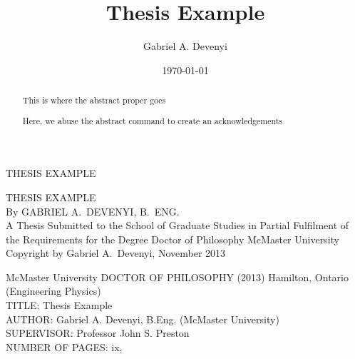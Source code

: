 \documentclass[letterpaper,12pt,twoside,openright]{report}
\title{Thesis Example}
\author{Gabriel A. Devenyi}
\date{\today}
\begin{document}
\begin{titlepage} %
    \thispagestyle{empty}
    \vspace*{\fill}
    \begin{center}{\Large
    \uppercase{Thesis Example}}
    \end{center}
    \vspace*{\fill}
    \setcounter{page}{0} %
\end{titlepage}

\begin{titlepage} %
\thispagestyle{empty}
\centering
\vspace*{\fill} %
{\Large \uppercase{Thesis Example}\\
\vfill
By GABRIEL A.\ DEVENYI, B.\ ENG.\\}
\vfill
A Thesis Submitted to the School of Graduate Studies in Partial Fulfilment of
the Requirements for the Degree Doctor of Philosophy
\vfill%
McMaster University \textcopyright{} Copyright by Gabriel A.\ Devenyi, November 2013
\end{titlepage}
{\noindent McMaster University DOCTOR OF PHILOSOPHY (2013) Hamilton, Ontario (Engineering Physics)\\
TITLE: Thesis Example\\
AUTHOR: Gabriel A. Devenyi, B.Eng. (McMaster University)\\
SUPERVISOR: Professor John S. Preston\\
NUMBER OF PAGES: ix,~\pageref{LastPage}}
    \begin{abstract}
        \thispagestyle{plain}
        \setcounter{page}{3}
            This is where the abstract proper goes
    \end{abstract}

    \renewcommand{\abstractname}{Acknowledgements}
    \begin{abstract} \setcounter{page}{4} \thispagestyle{plain}
        Here, we abuse the abstract command to create an acknowledgements
    \end{abstract}
    
    \setcounter{secnumdepth}{3} %
    \tableofcontents %
    {\listoffigures \let\cleardoublepage\clearpage %
    \printnomenclature}
\end{document}
